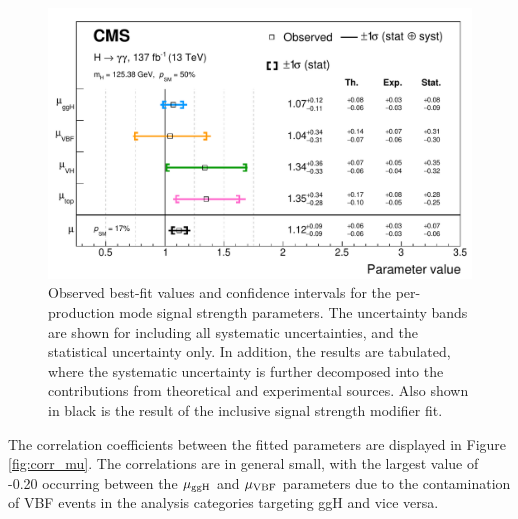 \begin{figure}[htb!]
  \centering
  \includegraphics[width=1\textwidth]{Figures/hgg_results/mu_summary.pdf}
  \caption[Summary of the signal strength fit results]
  {
    Observed best-fit values and confidence intervals for the per-production mode signal strength parameters. The uncertainty bands are shown for including all systematic uncertainties, and the statistical uncertainty only. In addition, the results are tabulated, where the systematic uncertainty is further decomposed into the contributions from theoretical and experimental sources. Also shown in black is the result of the inclusive signal strength modifier fit.
  }
  \label{fig:summary_mu}
\end{figure}

The correlation coefficients between the fitted parameters are displayed in Figure \ref{fig:corr_mu}. The correlations are in general small, with the largest value of -0.20 occurring between the $\mu_{\rm{ggH}}$ and $\mu_{\rm{VBF}}$ parameters due to the contamination of VBF events in the analysis categories targeting ggH and vice versa. 

